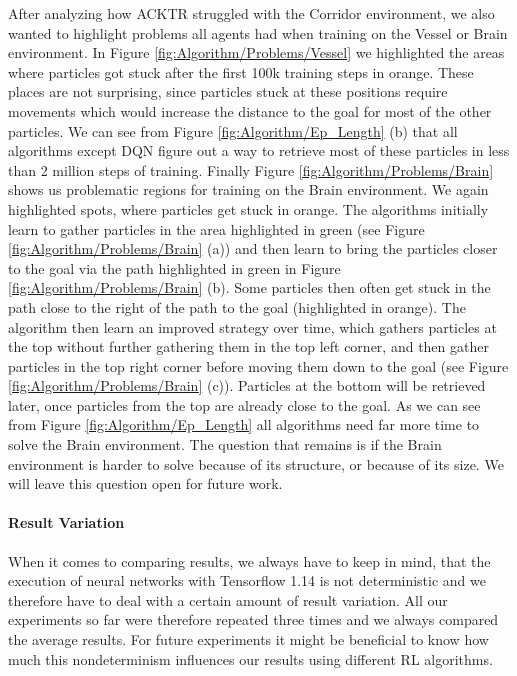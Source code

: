 After analyzing how ACKTR struggled with the Corridor environment, we also wanted to highlight problems all agents had when training on the Vessel or Brain environment. In Figure \ref{fig:Algorithm/Problems/Vessel} we highlighted the areas where particles got stuck after the first 100k training steps in orange. These places are not surprising, since particles stuck at these positions require movements which would increase the distance to the goal for most of the other particles. We can see from Figure \ref{fig:Algorithm/Ep_Length} (b) that all algorithms except DQN figure out a way to retrieve most of these particles in less than 2 million steps of training. Finally Figure \ref{fig:Algorithm/Problems/Brain} shows us problematic regions for training on the Brain environment. We again highlighted spots, where particles get stuck in orange. The algorithms initially learn to gather particles in the area highlighted in green (see Figure \ref{fig:Algorithm/Problems/Brain} (a)) and then learn to bring the particles closer to the goal via the path highlighted in green in Figure \ref{fig:Algorithm/Problems/Brain} (b). Some particles then often get stuck in the path close to the right of the path to the goal (highlighted in orange). The algorithm then learn an improved strategy over time, which gathers particles at the top without further gathering them in the top left corner, and then gather particles in the top right corner before moving them down to the goal (see Figure \ref{fig:Algorithm/Problems/Brain} (c)). Particles at the bottom will be retrieved later, once particles from the top are already close to the goal. As we can see from Figure \ref{fig:Algorithm/Ep_Length} all algorithms need far more time to solve the Brain environment. The question that remains is if the Brain environment is harder to solve because of its structure, or because of its size. We will leave this question open for future work.

\paragraph{Result Variation}
When it comes to comparing results, we always have to keep in mind, that the execution of neural networks with Tensorflow 1.14 is not deterministic and we therefore have to deal with a certain amount of result variation. All our experiments so far were therefore repeated three times and we always compared the average results. For future experiments it might be beneficial to know how much this nondeterminism influences our results using different RL algorithms.

